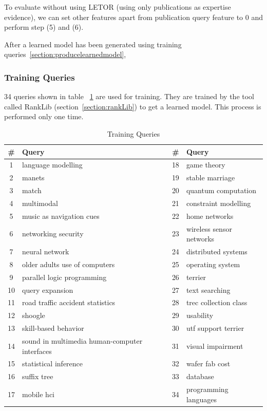 To evaluate without using LETOR (using only publications as expertise evidence), we can set other features apart from publication query feature to 0
and perform step (5) and (6).

After a learned model has been generated using training queries~\ref{section:producelearnedmodel},
\subsubsection{Training Queries}
34 queries shown in table ~\ref{table:trainingqueries} are used for training. They are trained by the tool called RankLib (section~\ref{section:rankLib}) to get a learned model. 
This process is performed only one time.
\begin{table}
\centering
\begin{tabular}{|c|l|c|l|}
\hline \textbf{\#} & \textbf{Query} & \textbf{\#} & \textbf{Query} \\
\hline 1 & language modelling & 18 & game theory\\
\hline 2 & manets & 19 & stable marriage \\
\hline 3  & match & 20 & quantum computation\\ 
\hline 4  & multimodal & 21 & constraint modelling\\ 
\hline 5  & music as navigation cues & 22 & home networks\\ 
\hline 6  & networking security & 23 & wireless sensor networks\\ 
\hline 7  & neural network & 24 & distributed systems\\ 
\hline 8  & older adults use of computers & 25 & operating system\\ 
\hline 9  & parallel logic programming & 26 & terrier\\ 
\hline 10  & query expansion & 27 & text searching\\ 
\hline 11  & road traffic accident statistics & 28 & trec collection class\\ 
\hline 12  & shoogle & 29 & usability\\ 
\hline 13  & skill-based behavior & 30 & utf support terrier\\ 
\hline 14  & sound in multimedia human-computer interfaces & 31 & visual impairment\\ 
\hline 15  & statistical inference & 32 & wafer fab cost \\ 
\hline 16  & suffix tree & 33 & database\\ 
\hline 17  & mobile hci & 34 & programming languages\\ 
\hline
\end{tabular}
\caption{Training Queries} \label{table:trainingqueries}
\end{table}

